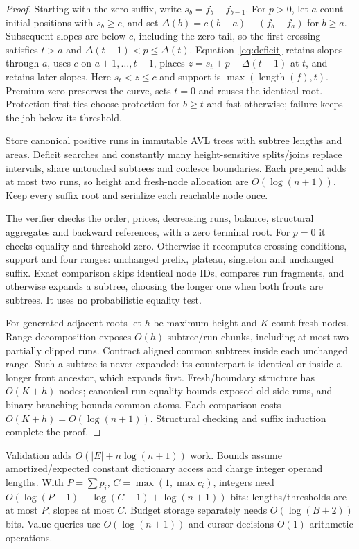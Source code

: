 \documentclass[acmsmall,screen,review,anonymous]{acmart}
\begin{document}
\begin{proof}
Starting with the zero suffix, write $s_b=f_b-f_{b-1}$. For $p>0$, let $a$ count initial positions with $s_b\ge c$, and set $\Delta(b)=c(b-a)-(f_b-f_a)$ for $b\ge a$. Subsequent slopes are below $c$, including the zero tail, so the first crossing satisfies $t>a$ and $\Delta(t-1)<p\le\Delta(t)$. Equation~\eqref{eq:deficit} retains slopes through $a$, uses $c$ on $a+1,\ldots,t-1$, places $z=s_t+p-\Delta(t-1)$ at $t$, and retains later slopes. Here $s_t<z\le c$ and support is $\max(\operatorname{length}(f),t)$. Premium zero preserves the curve, sets $t=0$ and reuses the identical root. Protection-first ties choose protection for $b\ge t$ and fast otherwise; failure keeps the job below its threshold.

Store canonical positive runs in immutable AVL trees with subtree lengths and areas. Deficit searches and constantly many height-sensitive splits/joins replace intervals, share untouched subtrees and coalesce boundaries. Each prepend adds at most two runs, so height and fresh-node allocation are $O(\log(n+1))$. Keep every suffix root and serialize each reachable node once.

The verifier checks the order, prices, decreasing runs, balance, structural aggregates and backward references, with a zero terminal root. For $p=0$ it checks equality and threshold zero. Otherwise it recomputes crossing conditions, support and four ranges: unchanged prefix, plateau, singleton and unchanged suffix. Exact comparison skips identical node IDs, compares run fragments, and otherwise expands a subtree, choosing the longer one when both fronts are subtrees. It uses no probabilistic equality test.

For generated adjacent roots let $h$ be maximum height and $K$ count fresh nodes. Range decomposition exposes $O(h)$ subtree/run chunks, including at most two partially clipped runs. Contract aligned common subtrees inside each unchanged range. Such a subtree is never expanded: its counterpart is identical or inside a longer front ancestor, which expands first. Fresh/boundary structure has $O(K+h)$ nodes; canonical run equality bounds exposed old-side runs, and binary branching bounds common atoms. Each comparison costs $O(K+h)=O(\log(n+1))$. Structural checking and suffix induction complete the proof.
\end{proof}

Validation adds $O(|E|+n\log(n+1))$ work. Bounds assume amortized/expected constant dictionary access and charge integer operand lengths. With $P=\sum p_i$, $C=\max(1,\max c_i)$, integers need $O(\log(P+1)+\log(C+1)+\log(n+1))$ bits: lengths/thresholds are at most $P$, slopes at most $C$. Budget storage separately needs $O(\log(B+2))$ bits. Value queries use $O(\log(n+1))$ and cursor decisions $O(1)$ arithmetic operations.
\end{document}
